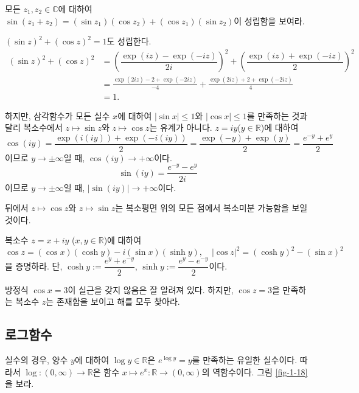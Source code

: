 \begin{salt_exercise} \label{ex-1-36}
모든 $z_1, z_2 \in \mathbb C$에 대하여
$\sin(z_1+z_2) = (\sin z_1)(\cos z_2) + (\cos z_1)(\sin z_2)$이 성립함을 보여라.
\end{salt_exercise}

$(\sin z)^2 + (\cos z)^2 = 1$도 성립한다.
\begin{align*}
(\sin z)^2 + (\cos z)^2 
&=  \left(\dfrac{\exp(iz)-\exp(-iz)}{2i}\right)^2
+ \left(\dfrac{\exp(iz)+\exp(-iz)}{2}\right)^2 \\
&= \frac{\exp(2iz) - 2 + \exp(-2iz)}{-4}
+ \frac{\exp(2iz) + 2 + \exp(-2iz)}4 \\
&=1.
\end{align*}

하지만,  삼각함수가 모든 실수 $x$에 대하여
$|\sin x| \le 1$와 $|\cos x|\le 1$를 만족하는 것과 달리
복소수에서 
$z\mapsto \sin z$와 $z\mapsto \cos z$는 유계가 아니다.
$z=iy$($y\in\mathbb R$)에 대하여
$$
\cos (iy) = \frac{\exp(i(iy))+\exp(-i(iy))}2
= \frac{\exp(-y) + \exp(y)}2 = \frac{e^{-y}+e^y}2
$$
이므로
$y\to \pm \infty$일 때, $\cos(iy) \to +\infty$이다.
$$
\sin(iy) = \frac{e^{-y}-e^y}{2i}
$$
이므로 
$y\to \pm \infty$일 때, $|\sin(iy)| \to +\infty$이다.

뒤에서 $z\mapsto \cos z$와 $z\mapsto \sin z$는 
복소평면 위의 모든 점에서 복소미분 가능함을 보일 것이다.


\begin{salt_exercise} \label{ex-1-37}
복소수 $z=x+iy$ ($x,y\in\mathbb R$)에 대하여
$$
\cos z = (\cos x)(\cosh y) - i(\sin x)(\sinh y), \quad
|\cos z|^2 = (\cosh y)^2 - (\sin x)^2
$$
을 증명하라. 단, $\cosh y := \dfrac{e^y+e^{-y}}2$, 
$\sinh y := \dfrac{e^y-e^{-y}}2$이다.
\end{salt_exercise}

\begin{salt_exercise} \label{ex-1-38}
방정식 $\cos x = 3$이 실근을 갖지 않음은 잘 알려져 있다.
하지만, $\cos z=3$을 만족하는 복소수 $z$는 존재함을 보이고
해를 모두 찾아라.
\end{salt_exercise}

\subsection{로그함수}

실수의 경우,
양수 $y$에 대하여 $\log y\in \mathbb R$은
$e^{\log y} = y$를 만족하는 유일한 실수이다.
따라서 $\log : (0,\infty) \to \mathbb R$은 
함수 $x\mapsto e^x: \mathbb R \to (0,\infty)$의 역함수이다.
그림 \ref{fig-1-18}을 보라.


